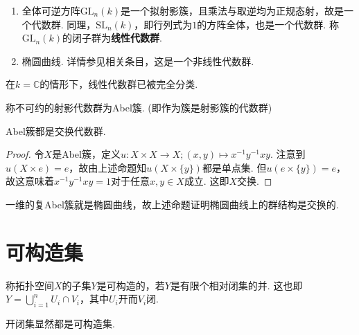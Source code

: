     \begin{example}
        \begin{enumerate}
            \item[(1)] 全体可逆方阵$\mathrm{GL}_{n}(k)$是一个拟射影簇，且乘法与取逆均为正规态射，故是一个代数群.
                       同理，$\mathrm{SL}_{n}(k)$，即行列式为$1$的方阵全体，也是一个代数群. 称$\mathrm{GL}_{n}(k)$的闭子群为\textbf{线性代数群}.
            \item[(2)] 椭圆曲线. 详情参见相关条目，这是一个非线性代数群.
        \end{enumerate}
    \end{example}
    
    在$k=\mathbb{C}$的情形下，线性代数群已被完全分类.

    \begin{definition}
        称不可约的射影代数群为Abel簇. (即作为簇是射影簇的代数群)
    \end{definition}
    
    \begin{theorem}
        Abel簇都是交换代数群.
    \end{theorem}
    \begin{proof}
        令$X$是Abel簇，定义$u\colon X \times X \rightarrow X; (x,y) \mapsto x^{-1}y^{-1}xy$.
        注意到$u(X \times e)=e$，故由上述命题知$u(X \times \{y\})$都是单点集. 
        但$u(e \times \{y\})=e$，故这意味着$x^{-1}y^{-1}xy=1$对于任意$x,y \in X$成立. 
        这即$X$交换.
    \end{proof}

    一维的复Abel簇就是椭圆曲线，故上述命题证明椭圆曲线上的群结构是交换的.

\section{可构造集}
    \begin{definition}
      称拓扑空间$X$的子集$Y$是可构造的，若$Y$是有限个相对闭集的并. 
      这也即$Y = \bigcup_{i=1}^{n} U_{i} \cap V_{i}$，其中$U_{i}$开而$V_{i}$闭.
    \end{definition}

    \begin{remark}
        开闭集显然都是可构造集.
    \end{remark}

